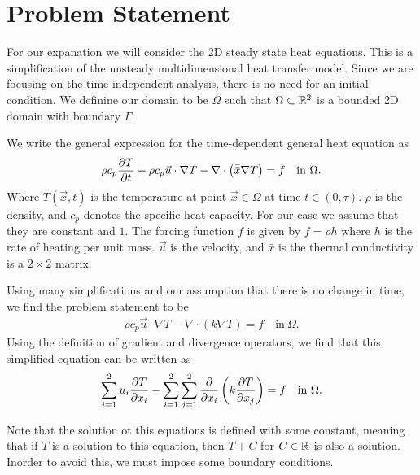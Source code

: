 \documentclass[../fem.tex]{subfiles}
\begin{document}
\section{Problem Statement}%
\label{sec:problem_statement}

For our expanation we will consider the 2D steady state heat equations. This is
a simplification of the unsteady multidimensional heat transfer model. Since we
are focusing on the time independent analysis, there is no need for an initial
condition. We definine our domain to be $\Omega$ such that $\Omega \subset
\R^2$ is a bounded 2D domain with boundary $\Gamma$.

We write the general expression for the time-dependent general heat equation as
\begin{align*}
  \rho c_p \pder[T]{t}+\rho c_p\vec{u}\cdot\nabla T - \nabla
  \cdot\left(\bar{\bar{x}}\nabla T\right)=f \quad \text{in}\ \Omega.
\end{align*}
Where $T(\vec{x},t)$ is the temperature at point $\vec{x}\in\Omega$ at time
$t\in(0,\tau)$. $\rho$ is the density, and $c_p$ denotes the specific heat
capacity. For our case we assume that they are constant and $1$. The forcing
function $f$ is given by $f=\rho h$ where $h$ is the rate of heating per unit
mass. $\vec{u}$ is the velocity, and $\bar{\bar{x}}$ is the thermal
conductivity is a $2\times 2$ matrix.

Using many simplifications and our assumption that there is no change in time,
we find the problem statement to be
\begin{align}\label{eq:pde}
  \rho c_p\vec{u}\cdot \nabla T-\nabla\cdot(k\nabla T)=f \quad \text{in}\ \Omega.
\end{align}
Using the definition of gradient and divergence operators, we find that this
simplified equation can be written as
\begin{align*}
  \sum_{i=1}^2u_i\pder[T]{x_i}-\sum_{i=1}^2\sum_{j=1}^2\pder{x_i}\left(k\pder[T]{x_j}\right)=f
    \quad \text{in}\ \Omega.
\end{align*}

Note that the solution ot this equations is defined with some constant, meaning
that if $T$ is a solution to this equation, then $T+C$ for $C\in\R$ is also a
solution. Inorder to avoid this, we must impose some boundary conditions.
\end{document}
